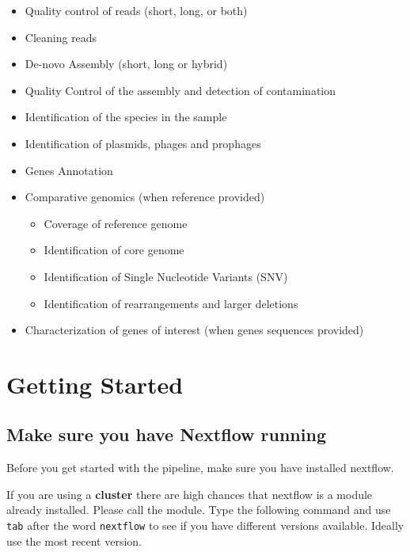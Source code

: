 \documentclass[
]{book}
\providecommand{\tightlist}{%
  \setlength{\itemsep}{0pt}\setlength{\parskip}{0pt}}
\begin{document}
\begin{itemize}
\tightlist
\item
  Quality control of reads (short, long, or both)
\item
  Cleaning reads
\item
  De-novo Assembly (short, long or hybrid)
\item
  Quality Control of the assembly and detection of contamination
\item
  Identification of the species in the sample
\item
  Identification of plasmids, phages and prophages
\item
  Genes Annotation
\item
  Comparative genomics (when reference provided)

  \begin{itemize}
  \tightlist
  \item
    Coverage of reference genome
  \item
    Identification of core genome
  \item
    Identification of Single Nucleotide Variants (SNV)
  \item
    Identification of rearrangements and larger deletions
  \end{itemize}
\item
  Characterization of genes of interest (when genes sequences provided)
\end{itemize}

\hypertarget{getting-started}{%
\chapter{Getting Started}\label{getting-started}}

\hypertarget{make-sure-you-have-nextflow-running}{%
\section{Make sure you have Nextflow running}\label{make-sure-you-have-nextflow-running}}

Before you get started with the pipeline, make sure you have installed nextflow.

If you are using a \textbf{cluster} there are high chances that nextflow is a module already installed. Please call the module. Type the following command and use \texttt{tab} after the word \texttt{nextflow} to see if you have different versions available. Ideally use the most recent version.
\end{document}
